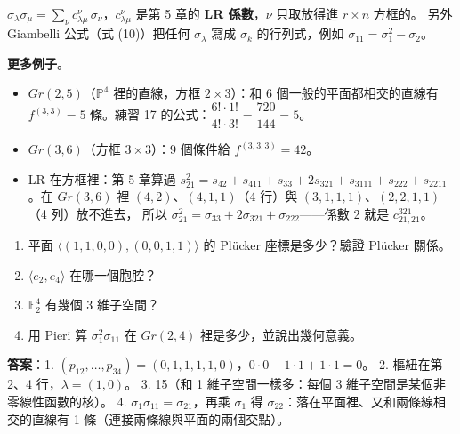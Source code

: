 \begin{keybox}
$\sigma_\lambda\sigma_\mu=\sum_\nu c^\nu_{\lambda\mu}\,\sigma_\nu$，$c^\nu_{\lambda\mu}$ 是第 5 章的 \textbf{LR 係數}，$\nu$ 只取放得進 $r\times n$ 方框的。
另外 Giambelli 公式（式 (10)）把任何 $\sigma_\lambda$ 寫成 $\sigma_k$ 的行列式，例如 $\sigma_{11}=\sigma_1^2-\sigma_2$。
\end{keybox}

\textbf{更多例子}。
\begin{itemize}[nosep]
\item $Gr(2,5)$（$\mathbb P^4$ 裡的直線，方框 $2\times3$）：和 6 個一般的平面都相交的直線有 $f^{(3,3)}=5$ 條。練習 17 的公式：$\dfrac{6!\cdot1!}{4!\cdot3!}=\dfrac{720}{144}=5$。
\item $Gr(3,6)$（方框 $3\times3$）：9 個條件給 $f^{(3,3,3)}=42$。
\item LR 在方框裡：第 5 章算過 $s_{21}^2=s_{42}+s_{411}+s_{33}+2s_{321}+s_{3111}+s_{222}+s_{2211}$。在 $Gr(3,6)$ 裡 $(4,2)$、$(4,1,1)$（4 行）與 $(3,1,1,1)$、$(2,2,1,1)$（4 列）放不進去，
      所以 $\sigma_{21}^2=\sigma_{33}+2\sigma_{321}+\sigma_{222}$——係數 2 就是 $c^{321}_{21,21}$。
\end{itemize}

\begin{notebox}[練習（答案在後面）]
\begin{enumerate}[nosep]
\item 平面 $\langle(1,1,0,0),(0,0,1,1)\rangle$ 的 Plücker 座標是多少？驗證 Plücker 關係。
\item $\langle e_2,e_4\rangle$ 在哪一個胞腔？
\item $\mathbb F_2^4$ 有幾個 3 維子空間？
\item 用 Pieri 算 $\sigma_1^2\sigma_{11}$ 在 $Gr(2,4)$ 裡是多少，並說出幾何意義。
\end{enumerate}
\textbf{答案}：1. $(p_{12},\dots,p_{34})=(0,1,1,1,1,0)$，$0\cdot0-1\cdot1+1\cdot1=0$。
2. 樞紐在第 2、4 行，$\lambda=(1,0)$。
3. 15（和 1 維子空間一樣多：每個 3 維子空間是某個非零線性函數的核）。
4. $\sigma_1\sigma_{11}=\sigma_{21}$，再乘 $\sigma_1$ 得 $\sigma_{22}$：落在平面裡、又和兩條線相交的直線有 1 條（連接兩條線與平面的兩個交點）。
\end{notebox}
